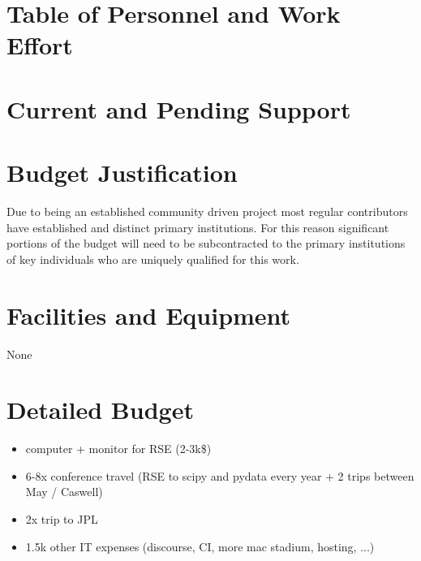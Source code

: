 \documentclass[12pt]{article}
\numberwithin{page}{section}
\begin{document}
\section{Table of Personnel and Work Effort}
\setcounter{page}{1}

\newpage
\section{Current and Pending Support}
\setcounter{page}{1}

\newpage
\section{Budget Justification}
\setcounter{page}{1}

Due to being an established community driven project most regular
contributors have established and distinct primary institutions.  For
this reason significant portions of the budget will need to be
subcontracted to the primary institutions of key individuals who are
uniquely qualified for this work.

\newpage
\section{Facilities and Equipment}
\setcounter{page}{1}

None

\newpage
\section{Detailed Budget}
\setcounter{page}{1}

\begin{itemize}
\item computer + monitor for RSE (2-3k\$)
\item 6-8x conference travel (RSE to scipy and pydata every year + 2
  trips between May / Caswell)
\item 2x trip to JPL
\item 1.5k other IT expenses (discourse, CI, more mac stadium, hosting, ...)
\end{itemize}
\end{document}
